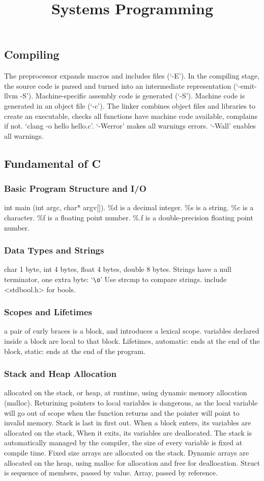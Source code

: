 \documentclass{article}
\title{Systems Programming}
\author{}
\date{}
\begin{document}
\small

\subsection*{Compiling}

The preprocessor expands macros and includes files (`-E').
In the compiling stage, the source code is parsed and turned into an intermediate representation (`-emit-llvm -S').
Machine-specific assembly code is generated (`-S'). 
Machine code is generated in an object file (`-c').
The linker combines object files and libraries to create an executable,
checks all functions have machine code available, complains if not.
`clang -o hello hello.c'.
`-Werror' makes all warnings errors.
`-Wall' enables all warnings.

\subsection*{Fundamental of C}

\subsubsection*{Basic Program Structure and I/O}
int main (int argc, char* argv[]). \%d is a decimal integer. \%s is a string. \%c is a character. \%f is a floating point number.
\%.f is a double-precision floating point number.

\subsubsection*{Data Types and Strings}
char 1 byte, int 4 bytes, float 4 bytes, double 8 bytes.
Strings have a null terminator, one extra byte: `\texttt{\textbackslash o}'
Use strcmp to compare strings.
include \textless stdbool.h\textgreater{} for bools.

\subsubsection*{Scopes and Lifetimes}
a pair of curly braces is a block, and introduces a lexical scope.
variables declared inside a block are local to that block.
Lifetimes, automatic: ends at the end of the block,
static: ends at the end of the program.

\subsubsection*{Stack and Heap Allocation}
allocated on the stack, or heap, at runtime, using dynamic memory allocation (malloc).
Returining pointers to local variables is dangerous, as the local variable will go out of
scope when the function returns and the pointer will point to invalid memory.
Stack is last in first out. When a block enters, its variables are allocated on the stack,
When it exits, its variables are deallocated.
The stack is automatically managed by the compiler, the size of every variable is fixed at compile time.
Fixed size arrays are allocated on the stack.
Dynamic arrays are allocated on the heap, using malloc for allocation and free for deallocation.
Struct is sequence of members, passed by value.
Array, passed by reference.
\end{document}
